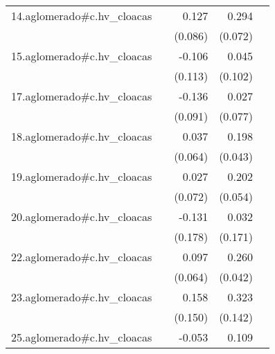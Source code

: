 {\begin{longtable}{l*{4}{D{.}{.}{-1}}}
\addlinespace
14.aglomerado#c.hv\_cloacas&                     &       0.127         &       0.294\sym{***}&                     \\
            &                     &     (0.086)         &     (0.072)         &                     \\
\addlinespace
15.aglomerado#c.hv\_cloacas&                     &      -0.106         &       0.045         &                     \\
            &                     &     (0.113)         &     (0.102)         &                     \\
\addlinespace
17.aglomerado#c.hv\_cloacas&                     &      -0.136         &       0.027         &                     \\
            &                     &     (0.091)         &     (0.077)         &                     \\
\addlinespace
18.aglomerado#c.hv\_cloacas&                     &       0.037         &       0.198\sym{***}&                     \\
            &                     &     (0.064)         &     (0.043)         &                     \\
\addlinespace
19.aglomerado#c.hv\_cloacas&                     &       0.027         &       0.202\sym{***}&                     \\
            &                     &     (0.072)         &     (0.054)         &                     \\
\addlinespace
20.aglomerado#c.hv\_cloacas&                     &      -0.131         &       0.032         &                     \\
            &                     &     (0.178)         &     (0.171)         &                     \\
\addlinespace
22.aglomerado#c.hv\_cloacas&                     &       0.097         &       0.260\sym{***}&                     \\
            &                     &     (0.064)         &     (0.042)         &                     \\
\addlinespace
23.aglomerado#c.hv\_cloacas&                     &       0.158         &       0.323\sym{*}  &                     \\
            &                     &     (0.150)         &     (0.142)         &                     \\
\addlinespace
25.aglomerado#c.hv\_cloacas&                     &      -0.053         &       0.109         &                     \\

\end{longtable}}
